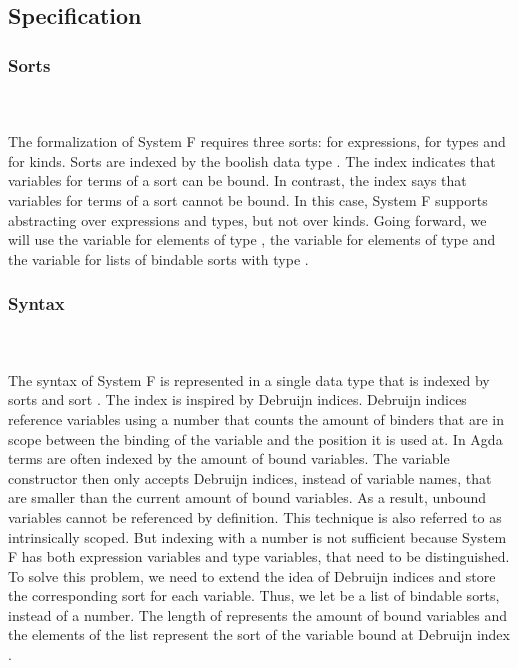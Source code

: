 \subsection{Specification}
\subsubsection{Sorts}\hfill\\\\
The formalization of System F requires three sorts:  for expressions,  for types and  for kinds. 
\FSort
Sorts are indexed by the boolish data type . 
The index  indicates that variables for terms of a sort can be bound. 
In contrast, the index  says that variables for terms of a sort cannot be bound. 
In this case, System F supports abstracting over expressions and types, but not over kinds. 
Going forward, we will use the variable  for elements of type , the variable  for elements of type  and the variable  for lists of bindable sorts with type \FSorts.

\subsubsection{Syntax}\hfill\\\\
The syntax of System F is represented in a single data type  that is indexed by sorts  and sort . 
The index  is inspired by Debruijn indices. 
Debruijn indices reference variables using a number that counts the amount of binders that are in scope between the binding of the variable and the position it is used at. 
In Agda terms are often indexed by the amount of bound variables. 
The variable constructor then only accepts Debruijn indices, instead of variable names, that are smaller than the current amount of bound variables.
As a result, unbound variables cannot be referenced by definition. 
This technique is also referred to as intrinsically scoped.
But indexing  with a number is not sufficient because System F has both expression variables and type variables, that need to be distinguished. 
To solve this problem, we need to extend the idea of Debruijn indices and store the corresponding sort for each variable. Thus, we let  be a list of bindable sorts, instead of a number.
The length of  represents the amount of bound variables and the elements  of the list represent the sort of the variable bound at Debruijn index . 

